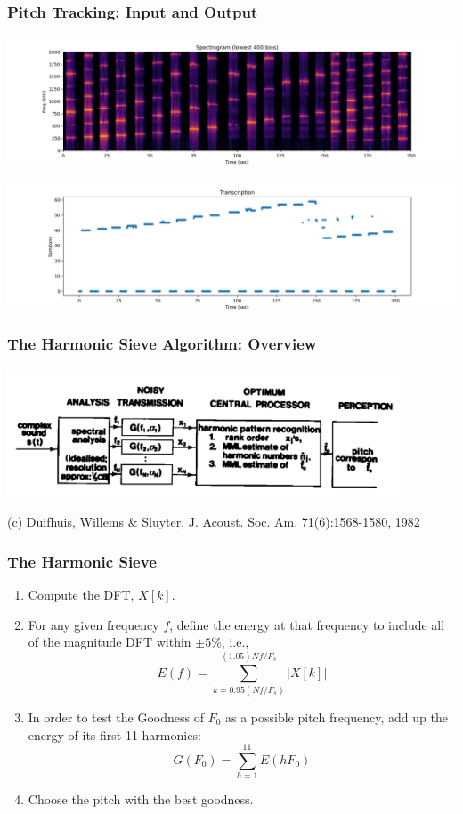 \documentclass{beamer}
\begin{document}
\begin{frame}
  \frametitle{Pitch Tracking: Input and Output}
  \centerline{\includegraphics[height=1.5in]{scale_spectrogram.png}}
  \centerline{\includegraphics[height=1.5in]{scale_pitches.png}}
\end{frame}

\begin{frame}
  \frametitle{The Harmonic Sieve Algorithm: Overview}
  
  \centerline{\includegraphics[height=1.5in]{duifhuis1.png}}
  \begin{tiny}
    (c) Duifhuis, Willems \& Sluyter, J. Acoust. Soc. Am. 71(6):1568-1580, 1982
  \end{tiny}
\end{frame}

\begin{frame}
  \frametitle{The Harmonic Sieve}

  \begin{enumerate}
  \item Compute the DFT, $X[k]$.
  \item For any given frequency $f$, define the energy at that
    frequency to include all of the magnitude DFT within $\pm 5$\%, i.e.,
    \[
    E(f) = \sum_{k=0.95(Nf/F_s)}^{(1.05)Nf/F_s} |X[k]|
    \]
  \item In order to test the Goodness of $F_0$ as a possible
    pitch frequency, add up the energy of its first 11 harmonics:
    \[
    G(F_0) = \sum_{h=1}^{11} E(hF_0)
    \]
  \item Choose the pitch with the best goodness.
  \end{enumerate}
\end{frame}
\end{document}
